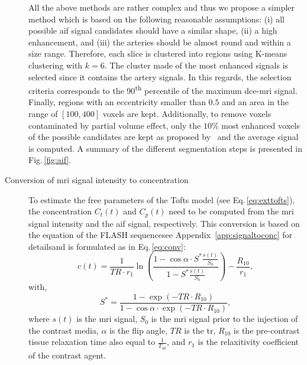 \begin{description}
    All the above methods are rather complex and thus we propose a simpler method which is based on the following reasonable assumptions:
    (i) all possible \ac{aif} signal candidates should have a similar shape,
    (ii) a high enhancement, and
    (iii) the arteries should be almost round and within a size range.
    Therefore, each slice is clustered into regions using K-means clustering with $k=6$.
    The cluster made of the most enhanced signals is selected since it contains the artery signals.
    In this regards, the selection criteria corresponds to the 90\textsuperscript{th} percentile of the maximum \ac{dce}-\ac{mri} signal.
    Finally, regions with an eccentricity smaller than $0.5$ and an area in the range of $[100, 400]$ voxels are kept.
    Additionally, to remove voxels contaminated by partial volume effect, only the $10\%$ most enhanced voxels of the possible candidates are kept as proposed by~\citep{schabel2008uncertainty} and the average signal is computed.
    A summary of the different segmentation steps is presented in Fig.\,\ref{fig:aif}.
    \item[Conversion of \ac{mri} signal intensity to concentration] To estimate the free parameters of the Tofts model (see Eq.\,\eqref{eq:exttofts}), the concentration $C_t(t)$ and $C_p(t)$ need to be computed from the \ac{mri} signal intensity and the \ac{aif} signal, respectively.
      This conversion is based on the equation of the FLASH sequence\textemdash see Appendix~\ref{app:signaltoconc} for details\textemdash and is formulated as in Eq.\,\eqref{eq:conv}:
      \begin{equation}
        c(t) = \frac{1}{TR \cdot r_1} \ln\left( \frac{1 - \cos \alpha \cdot S^{*}\frac{s(t)}{S_0}}{1 - S^{*}\frac{s(t)}{S_0}} \right) - \frac{R_{10}}{r_1} ,
        \label{eq:conv}
      \end{equation}
      \noindent with,
      \begin{equation}
        S^{*} = \frac{1 - \exp(- TR \cdot R_{10})}{1 - \cos \alpha \cdot \exp(- TR \cdot R_{10})} ,
        \label{eq:sstarconv}
      \end{equation}
      \noindent where $s(t)$ is the \ac{mri} signal, $S_0$ is the \ac{mri} signal prior to the injection of the contrast media, $\alpha$ is the flip angle, $TR$ is the \acf{tr}, $R_{10}$ is the pre-contrast tissue relaxation time also equal to $\frac{1}{T_{10}}$, and $r_1$ is the relaxitivity coefficient of the contrast agent.


\end{description}
